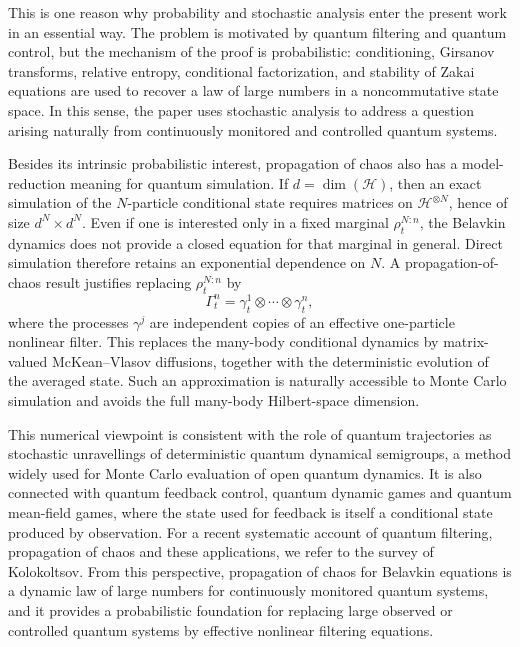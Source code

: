 \documentclass[10pt,a4paper,reqno]{amsart}
\numberwithin{equation}{section}
\theoremstyle{plain}
\theoremstyle{definition}
\theoremstyle{remark}
\newcommand{\HH}{\mathcal H}
\newcommand{\1}{\mathbf 1}
\begin{document}
This is one reason why probability and stochastic analysis enter the present
work in an essential way.  The problem is motivated by quantum filtering and
quantum control, but the mechanism of the proof is probabilistic: conditioning,
Girsanov transforms, relative entropy, conditional factorization, and stability
of Zakai equations are used to recover a law of large numbers in a
noncommutative state space.  In this sense, the paper uses stochastic analysis
to address a question arising naturally from continuously monitored and
controlled quantum systems.

Besides its intrinsic probabilistic interest, propagation of chaos also has a
model-reduction meaning for quantum simulation.  If \(d=\dim(\HH)\), then an
exact simulation of the \(N\)-particle conditional state requires matrices on
\(\HH^{\otimes N}\), hence of size \(d^N\times d^N\).  Even if one is
interested only in a fixed marginal \(\rho_t^{N:n}\), the Belavkin dynamics
does not provide a closed equation for that marginal in general.  Direct
simulation therefore retains an exponential dependence on \(N\).  A
propagation-of-chaos result justifies replacing \(\rho_t^{N:n}\) by
\[
  \Gamma_t^n
  =
  \gamma_t^1\otimes\cdots\otimes\gamma_t^n,
\]
where the processes \(\gamma^j\) are independent copies of an effective
one-particle nonlinear filter.  This replaces the many-body conditional
dynamics by matrix-valued McKean--Vlasov diffusions, together with the
deterministic evolution of the averaged state.  Such an approximation is
naturally accessible to Monte Carlo simulation and avoids the full many-body
Hilbert-space dimension.

This numerical viewpoint is consistent with the role of quantum trajectories
as stochastic unravellings of deterministic quantum dynamical semigroups, a
method widely used for Monte Carlo evaluation of open quantum dynamics.  It is
also connected with quantum feedback control, quantum dynamic games and
quantum mean-field games, where the state used for feedback is itself a
conditional state produced by observation.  For a recent systematic account of
quantum filtering, propagation of chaos and these applications, we refer to the survey  \cite{kolokoltsov2026survey} of
Kolokoltsov.  From this perspective, propagation
of chaos for Belavkin equations is a dynamic law of large numbers for
continuously monitored quantum systems, and it provides a probabilistic
foundation for replacing large observed or controlled quantum systems by
effective nonlinear filtering equations.
\end{document}
